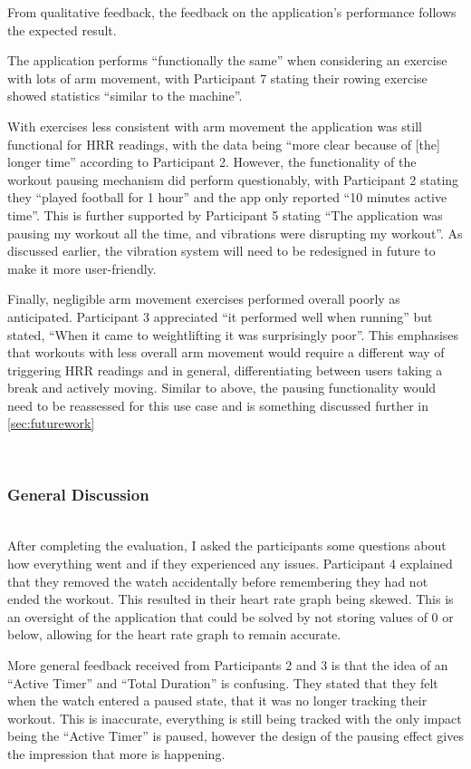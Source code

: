 \documentclass{l4proj}
\begin{document}
From qualitative feedback, the feedback on the application’s performance follows the expected result. 

The application performs “functionally the same” when considering an exercise with lots of arm movement, with Participant 7 stating their rowing exercise showed statistics “similar to the machine”. 

With exercises less consistent with arm movement the application was still functional for HRR readings, with the data being “more clear because of [the] longer time” according to Participant 2. However, the functionality of the workout pausing mechanism did perform questionably, with Participant 2 stating they “played football for 1 hour” and the app only reported “10 minutes active time”. This is further supported by Participant 5 stating “The application was pausing my workout all the time, and vibrations were disrupting my workout”. As discussed earlier, the vibration system will need to be redesigned in future to make it more user-friendly.

Finally, negligible arm movement exercises performed overall poorly as anticipated. Participant 3 appreciated “it performed well when running” but stated, “When it came to weightlifting it was surprisingly poor”. This emphasises that workouts with less overall arm movement would require a different way of triggering HRR readings and in general, differentiating between users taking a break and actively moving. Similar to above, the pausing functionality would need to be reassessed for this use case and is something discussed further in \ref{sec:futurework}

\noindent\mbox{}\\
\subsubsection{General Discussion}
\noindent\mbox{}\\

After completing the evaluation, I asked the participants some questions about how everything went and if they experienced any issues. Participant 4 explained that they removed the watch accidentally before remembering they had not ended the workout. This resulted in their heart rate graph being skewed. This is an oversight of the application that could be solved by not storing values of 0 or below, allowing for the heart rate graph to remain accurate.

More general feedback received from Participants 2 and 3 is that the idea of an “Active Timer” and “Total Duration” is confusing. They stated that they felt when the watch entered a paused state, that it was no longer tracking their workout. This is inaccurate, everything is still being tracked with the only impact being the “Active Timer” is paused, however the design of the pausing effect gives the impression that more is happening.
\end{document}
